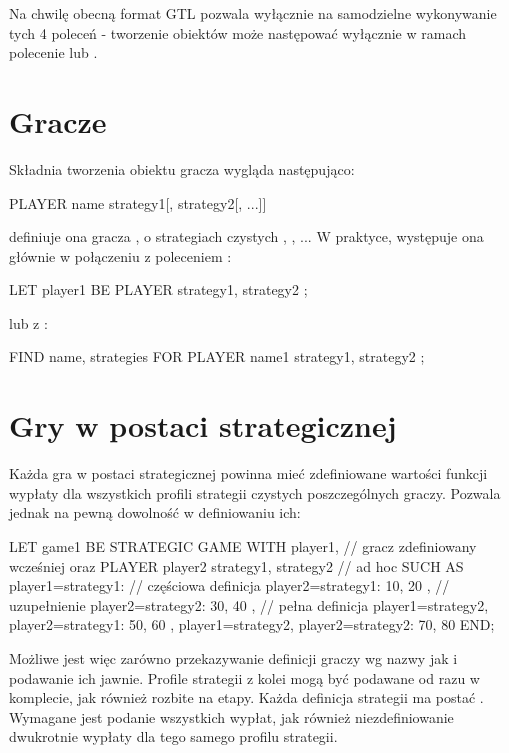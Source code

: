 \documentclass[polish]{standalone}
\begin{document}
Na chwilę obecną format GTL pozwala wyłącznie na samodzielne wykonywanie tych 4 poleceń - tworzenie obiektów może 
następować wyłącznie w ramach polecenie  lub .

\section{Gracze}

Składnia tworzenia obiektu gracza wygląda następująco:

\begin{gtl}
PLAYER name { strategy1[, strategy2[, ...]] }
\end{gtl}

definiuje ona gracza , o strategiach czystych , , ... W praktyce, występuje
ona głównie w połączeniu z poleceniem :

\begin{gtl}
LET player1 BE PLAYER { strategy1, strategy2 };
\end{gtl}

lub z :

\begin{gtl}
FIND name, strategies
 FOR PLAYER name1 { strategy1, strategy2 };
\end{gtl}

\section{Gry w postaci strategicznej}

Każda gra w postaci strategicznej powinna mieć zdefiniowane wartości funkcji wypłaty dla wszystkich profili strategii
czystych poszczególnych graczy. Pozwala jednak na pewną dowolność w definiowaniu ich:

\begin{gtl}
LET game1 BE
  STRATEGIC GAME
  WITH
    player1, // gracz zdefiniowany wcześniej oraz
    PLAYER player2 { strategy1, strategy2 } // ad hoc
  SUCH AS
    { player1=strategy1: // częściowa definicja
     { player2=strategy1: 10, 20 }, // uzupełnienie
     { player2=strategy2: 30, 40 }
    },
    // pełna definicja
    { player1=strategy2, player2=strategy1: 50, 60 },
    { player1=strategy2, player2=strategy2: 70, 80 }
  END;
\end{gtl}

Możliwe jest więc zarówno przekazywanie definicji graczy wg nazwy jak i podawanie ich jawnie. Profile strategii z
kolei mogą być podawane od razu w komplecie, jak również rozbite na etapy. Każda definicja strategii ma postać
. Wymagane jest podanie
wszystkich wypłat, jak również niezdefiniowanie dwukrotnie wypłaty dla tego samego profilu strategii.
\end{document}

